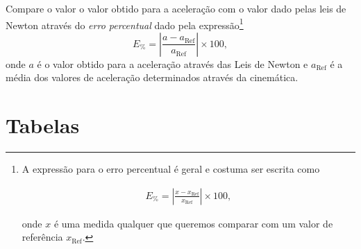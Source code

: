 \begin{question}[type={exam}]
Compare o valor o valor obtido para a aceleração com o valor dado pelas leis de Newton através do \emph{erro percentual} dado pela expressão\footnote[][-5mm]{A expressão para o erro percentual é geral e costuma ser escrita como %
\begin{minipage}{\linewidth} %
\begin{align*} %
    E_\% = \left|\frac{x - x_{\textrm{Ref}}}{x_{\textrm{Ref}}}\right| \times 100, %
\end{align*} %
\vspace{0.1mm}
\end{minipage} %
%
onde $x$ é uma medida qualquer que queremos comparar com um valor de referência $x_{\text{Ref}}$.}
\begin{equation}
	E_\% = \left|\frac{a - a_{\textrm{Ref}}}{a_{\textrm{Ref}}}\right| \times 100,
\end{equation}
%
onde $a$ é o valor obtido para a aceleração através das Leis de Newton e $a_{\textrm{Ref}}$ é a média dos valores de aceleração determinados através da cinemática.
\end{question}


\vfill
\pagebreak
\section{Tabelas}

